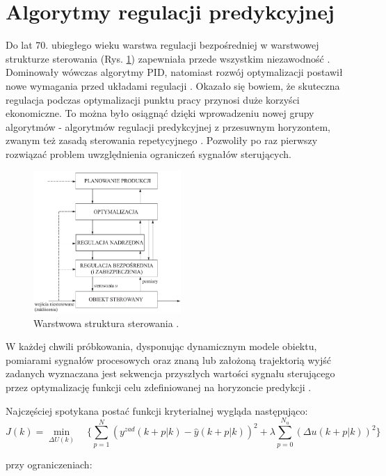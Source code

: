 \section{Algorytmy regulacji predykcyjnej}
Do lat 70. ubiegłego wieku warstwa regulacji bezpośredniej w warstwowej strukturze sterowania (Rys. \ref{warstwy}) zapewniała przede wszystkim niezawodność \cite{120}. Dominowały wówczas algorytmy PID, natomiast rozwój optymalizacji postawił nowe wymagania przed układami regulacji \cite{160}. Okazało się bowiem, że skuteczna regulacja podczas optymalizacji punktu pracy przynosi duże korzyści ekonomiczne. To można było osiągnąć dzięki wprowadzeniu nowej grupy algorytmów - algorytmów regulacji predykcyjnej z przesuwnym horyzontem, zwanym też zasadą sterowania repetycyjnego \cite{160}. Pozwoliły po raz pierwszy rozwiązać problem uwzględnienia ograniczeń sygnałów sterujących.

\begin{figure}[h!]
\centering
\includegraphics[width=0.5\textwidth]{pictures/warstwy}
\caption{Warstwowa struktura sterowania \cite{121}.}
\label{warstwy}
\end{figure}

W każdej chwili próbkowania, dysponując dynamicznym modele obiektu, pomiarami sygnałów procesowych oraz znaną lub założoną trajektorią wyjść zadanych wyznaczana jest sekwencja przyszłych wartości sygnału sterującego przez optymalizację funkcji celu zdefiniowanej na horyzoncie predykcji \cite{40}.

Najczęściej spotykana postać funkcji kryterialnej wygląda następująco:
\begin{equation}
J(k) = \min_{\Delta U(k)} \quad \{\sum_{p=1}^N (y^{zad}(k+p|k) - \hat{y}(k+p|k))^2 + \lambda \sum_{p=0}^{N_u} (\Delta u(k+p|k))^2\}
\end{equation}

przy ograniczeniach:

